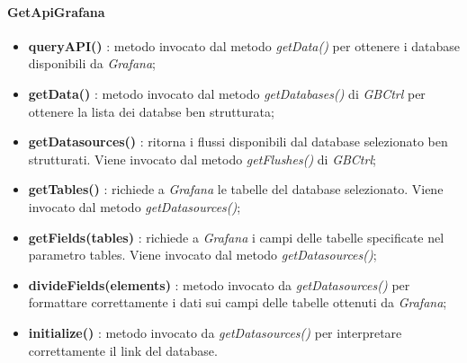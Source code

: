 				  \paragraph{GetApiGrafana}
			\begin{itemize}
				\item \textbf{queryAPI()} : metodo invocato dal metodo \textit{getData()} per ottenere i database disponibili da \textit{Grafana};
				\item \textbf{getData()} : metodo invocato dal metodo \textit{getDatabases()} di \textit{GBCtrl} per ottenere la lista dei databse ben strutturata;
				\item \textbf{getDatasources()} : ritorna i flussi disponibili dal database selezionato ben strutturati. Viene invocato dal metodo \textit{getFlushes()} di \textit{GBCtrl};
				\item \textbf{getTables()} : richiede a \textit{Grafana} le tabelle del database selezionato. Viene invocato dal metodo \textit{getDatasources()};
				\item \textbf{getFields(tables)} : richiede a \textit{Grafana} i campi delle tabelle specificate nel parametro tables. Viene invocato dal metodo \textit{getDatasources()};
				\item \textbf{divideFields(elements)} : metodo invocato da \textit{getDatasources()} per formattare correttamente i dati sui campi delle tabelle ottenuti da \textit{Grafana};
				\item \textbf{initialize()} : metodo invocato da \textit{getDatasources()} per interpretare correttamente il link del database.
			\end{itemize}